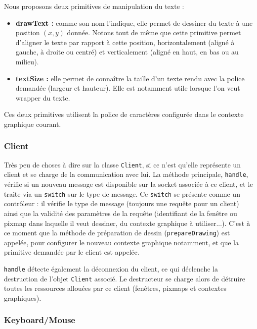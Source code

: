 Nous proposons deux primitives de manipulation du texte :
\begin{itemize}
  \item \textbf{drawText :} comme son nom l'indique, elle permet de dessiner du texte à une position $(x, y)$ donnée. Notons tout de même que cette primitive permet d'aligner le texte par rapport à cette position, horizontalement (aligné à gauche, à droite ou centré) et verticalement (aligné en haut, en bas ou au milieu).
  \item \textbf{textSize :} elle permet de connaître la taille d'un texte rendu avec la police demandée (largeur et hauteur). Elle est notamment utile lorsque l'on veut wrapper du texte.
\end{itemize}

\vspace{1em}

Ces deux primitives utilisent la police de caractères configurée dans le contexte graphique courant.

\subsubsection{Client}

Très peu de choses à dire sur la classe \verb|Client|, si ce n'est qu'elle représente un client et se charge de la communication avec lui. La méthode principale, \verb|handle|, vérifie si un nouveau message est disponible sur la socket associée à ce client, et le traite via un \verb|switch| sur le type de message. Ce \verb|switch| se présente comme un contrôleur : il vérifie le type de message (toujours une requête pour un client) ainsi que la validité des paramètres de la requête (identifiant de la fenêtre ou pixmap dans laquelle il veut dessiner, du contexte graphique à utiliser...). C'est à ce moment que la méthode de préparation de dessin (\verb|prepareDrawing|) est appelée, pour configurer le nouveau contexte graphique notamment, et que la primitive demandée par le client est appelée.

\verb|handle| détecte également la déconnexion du client, ce qui déclenche la destruction de l'objet \verb|Client| associé. Le destructeur se charge alors de détruire toutes les ressources allouées par ce client (fenêtres, pixmaps et contextes graphiques).

\subsubsection{Keyboard/Mouse}


